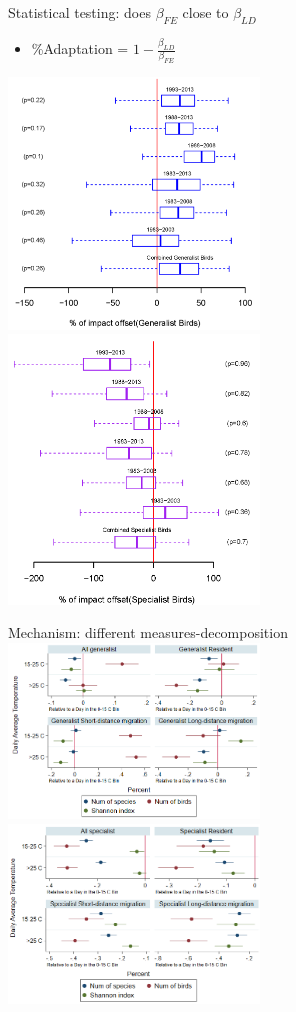 \documentclass[handout]{beamer}
\begin{document}
\begin{frame}{Statistical testing: does $\beta_{FE}$ close to $\beta_{LD}$}
  \begin{itemize}
    \item \%Adaptation = $1-\frac{\beta_{LD}}{\beta_{FE}}$
  \end{itemize}
\includegraphics[width=0.5\textwidth]{long_diff1.png}%
\includegraphics[width=0.5\textwidth]{long_diff2.png}
\end{frame}



\begin{frame}{Mechanism: different measures-decomposition}
  \includegraphics[width=0.5\textwidth]{bird_figure2b}%
  \includegraphics[width=0.5\textwidth]{bird_figure2c}
\end{frame}
\end{document}
